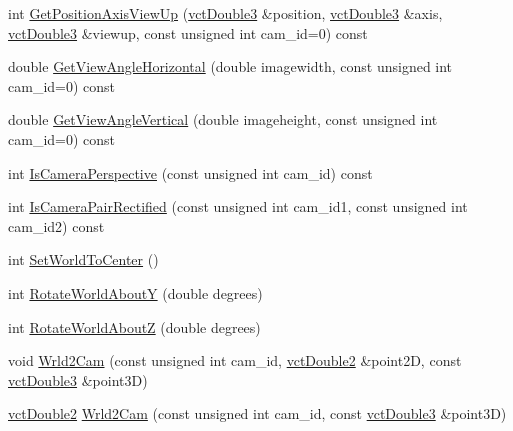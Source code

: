 \begin{DoxyCompactItemize}
\item 
int \hyperlink{classsvl_camera_geometry_a5f293aec0d4e9d41a4c8d30dfc77dee1}{Get\+Position\+Axis\+View\+Up} (\hyperlink{vct_fixed_size_vector_types_8h_a4a89122c9d7f72c3f31fe8126e17c3af}{vct\+Double3} \&position, \hyperlink{vct_fixed_size_vector_types_8h_a4a89122c9d7f72c3f31fe8126e17c3af}{vct\+Double3} \&axis, \hyperlink{vct_fixed_size_vector_types_8h_a4a89122c9d7f72c3f31fe8126e17c3af}{vct\+Double3} \&viewup, const unsigned int cam\+\_\+id=0) const 
\item 
double \hyperlink{classsvl_camera_geometry_a8adb85f453b87c6d2ba7fe40262e3680}{Get\+View\+Angle\+Horizontal} (double imagewidth, const unsigned int cam\+\_\+id=0) const 
\item 
double \hyperlink{classsvl_camera_geometry_a8117e2bb1739baadf3061bace9341a4b}{Get\+View\+Angle\+Vertical} (double imageheight, const unsigned int cam\+\_\+id=0) const 
\item 
int \hyperlink{classsvl_camera_geometry_a0db228770638c03964201ace4b75d34a}{Is\+Camera\+Perspective} (const unsigned int cam\+\_\+id) const 
\item 
int \hyperlink{classsvl_camera_geometry_a6563c6a2d6091bb39bdbea97f653b578}{Is\+Camera\+Pair\+Rectified} (const unsigned int cam\+\_\+id1, const unsigned int cam\+\_\+id2) const 
\item 
int \hyperlink{classsvl_camera_geometry_a14dfa42e2f573c50c82d7ba1d45542c7}{Set\+World\+To\+Center} ()
\item 
int \hyperlink{classsvl_camera_geometry_ae413342f4dc14a6e728b408c6b31bf04}{Rotate\+World\+About\+Y} (double degrees)
\item 
int \hyperlink{classsvl_camera_geometry_ac9cbf80ca8a2f17a6297e458710bab16}{Rotate\+World\+About\+Z} (double degrees)
\item 
void \hyperlink{classsvl_camera_geometry_acb82582bb903c09ebb98cd4c24c8d2e5}{Wrld2\+Cam} (const unsigned int cam\+\_\+id, \hyperlink{vct_fixed_size_vector_types_8h_afc0fdcc41cbe8b043747612501610812}{vct\+Double2} \&point2\+D, const \hyperlink{vct_fixed_size_vector_types_8h_a4a89122c9d7f72c3f31fe8126e17c3af}{vct\+Double3} \&point3\+D)
\item 
\hyperlink{vct_fixed_size_vector_types_8h_afc0fdcc41cbe8b043747612501610812}{vct\+Double2} \hyperlink{classsvl_camera_geometry_a0d644b2fcc4c6220c5da4af6aa9ccc43}{Wrld2\+Cam} (const unsigned int cam\+\_\+id, const \hyperlink{vct_fixed_size_vector_types_8h_a4a89122c9d7f72c3f31fe8126e17c3af}{vct\+Double3} \&point3\+D)
\item 

\end{DoxyCompactItemize}
